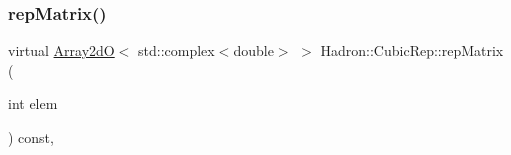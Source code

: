 \mbox{\label{structHadron_1_1CubicRep_ac5d7e9e6f4ab1158b5fce3e4ad9e8005}} 
\subsubsection{\texorpdfstring{repMatrix()}{repMatrix()}\hspace{0.1cm}{\footnotesize\ttfamily [2/3]}}
{\footnotesize\ttfamily virtual \mbox{\hyperlink{classADAT_1_1Array2dO}{Array2dO}}$<$ std\+::complex$<$double$>$ $>$ Hadron\+::\+Cubic\+Rep\+::rep\+Matrix (\begin{DoxyParamCaption}\item[{int}]{elem }\end{DoxyParamCaption}) const\hspace{0.3cm}{\ttfamily [inline]}, {\ttfamily [virtual]}}



